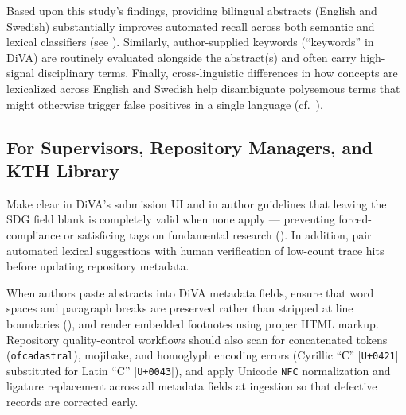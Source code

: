 Based upon this study's findings, providing bilingual abstracts (English and Swedish) substantially improves automated recall across both semantic and lexical classifiers (see ). Similarly, author-supplied keywords (\enquote{keywords} in \gls{DiVA}) are routinely evaluated alongside the abstract(s) and often carry high-signal disciplinary terms. Finally, cross-linguistic differences in how concepts are lexicalized across English and Swedish help disambiguate polysemous terms that might otherwise trigger false positives in a single language (cf.\ ).


\subsection{For Supervisors, Repository Managers, and KTH Library}

\begin{recommendation}
\label{rec:blankValidAndAudit}
Make clear in \gls{DiVA}'s submission \gls{UI} and in author guidelines that leaving the \gls{SDG} field blank is completely valid when none apply --- preventing forced-compliance or satisficing tags on fundamental research (). In addition, pair automated lexical suggestions with human verification of low-count trace hits before updating repository metadata.
\end{recommendation}

\begin{recommendation}
\label{rec:divaQualityControl}
When authors paste abstracts into \gls{DiVA} metadata fields, ensure that word spaces and paragraph breaks are preserved rather than stripped at line boundaries (), and render embedded footnotes using proper \gls{HTML} markup. Repository quality-control workflows should also scan for concatenated tokens (\eg \texttt{ofcadastral}), mojibake, and homoglyph encoding errors (\eg Cyrillic \enquote{С} [\texttt{U+0421}] substituted for Latin \enquote{C} [\texttt{U+0043}]), and apply Unicode \texttt{NFC} normalization and ligature replacement across all metadata fields at ingestion so that defective records are corrected early.
\end{recommendation}

